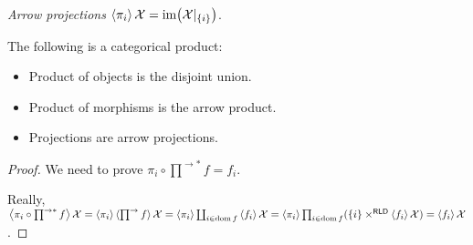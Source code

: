 
\begin{defn}
\emph{Arrow projections}
$\left\langle \pi_i\right\rangle\mathcal{X} = \operatorname{im}\bigl(\mathcal{X}|_{\{i\}}\bigr)$.
\end{defn}

\begin{thm}
The following is a categorical product:
\begin{itemize}
\item Product of objects is the disjoint union.
\item Product of morphisms is the arrow product.
\item Projections are arrow projections.
\end{itemize}
\end{thm}

\begin{proof}
We need to prove $\pi_i\circ\prod^{\rightarrow\ast}f=f_i$.

Really, $\left\langle \pi_i\circ\prod^{\rightarrow\ast}f\right\rangle\mathcal{X}=\left\langle \pi_i\right\rangle\left\langle \prod^{\rightarrow}f\right\rangle\mathcal{X}=\left\langle \pi_i\right\rangle\coprod_{i\in\operatorname{dom} f}\left\langle f_i\right\rangle\mathcal{X}=\left\langle \pi_i\right\rangle\prod_{i\in\operatorname{dom} f}(\{i\}\times^{\mathsf{RLD}}\left\langle f_i\right\rangle\mathcal{X})=\left\langle f_i\right\rangle\mathcal{X}$.
\end{proof}